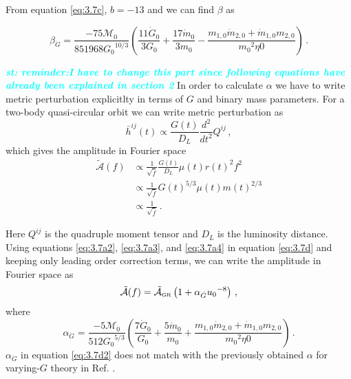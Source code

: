 \documentclass[prd,twocolumn,nofootinbib]{revtex4-1}
\newcommand{\GR}{{\mbox{\tiny GR}}}
\newcommand{\st}[1]{\textcolor{cyan}{\it{\textbf{st: #1}}} }
\begin{document}
\hspace*{15.5pt}From equation \eqref{eq:3.7c}, $b=-13$  and we can find $\beta$ as

 \begin{equation}
 \beta_{\dot{G}}=\frac{-75 \mathcal{M}_0}{851968 {G_0}^{10/3}} \left(\frac{11 \dot{G}_0}{3 G_0} + \frac{17 \dot{m}_0}{3m_0}-\frac{m_{1,0}\dot{m}_{2,0}+\dot{m}_{1,0}m_{2,0}}{{m_0}^2 \eta0}\right)\,.
  \end{equation}
 
 \hspace*{15.5pt}\st{reminder:I have to change this part since following equations have already been explained in section 2}In order to calculate $\alpha$ we have to write metric perturbation explicitlty in terms of $G$ and binary mass parameters. For a two-body quasi-circular orbit we can write metric perturbation as \cite{Blanchet:2002av}
 \begin{equation}
\bar{h}^{ij}(t)\propto \frac{G(t)}{D_L}\frac{d^2 }{d t^2}Q^{ij}\,,
 \end{equation}
which gives the amplitude in Fourier space
\begin{align}\label{eq:3.7d}
\tilde{\mathcal{A}}(f)&\propto\frac{1}{\sqrt{\dot{f}}}\frac{G(t)}{D_L}\mu(t) r(t)^2f^2\nonumber\\&\propto\frac{1}{\sqrt{\dot{f}}}{G(t)}^{5/3}\mu(t){m(t)}^{2/3}\nonumber\\ &\propto \frac{1}{\sqrt{\dot{f}}}  \,.
\end{align} 
 

Here $Q^{ij}$ is the quadruple moment tensor and $D_L$ is the luminosity distance. Using equations \eqref{eq:3.7a2}, \eqref{eq:3.7a3}, and \eqref{eq:3.7a4} in equation \eqref{eq:3.7d} and keeping only leading order correction terms, we can write the amplitude in Fourier space as
\begin{equation}
\tilde{\mathcal{A}}(f)=\tilde{\mathcal{A}}_{\GR}\left(1+\alpha_{\dot{G}}{u_0}^{-8}\right)\,,
\end{equation}
where
\begin{equation}\label{eq:3.7d2}
 \alpha_{\dot{G}}=\frac{-5\mathcal{M}_0}{512 {G_0}^{5/3}} \left(\frac{7 \dot{G}_0}{ G_0} + \frac{5\dot{m}_0}{m_0}+\frac{m_{1,0}\dot{m}_{2,0}+\dot{m}_{1,0}m_{2,0}}{{m_0}^2 \eta0}\right)\,.
 \end{equation}
 \hspace{15.5pt} $\alpha_{\dot{G}}$ in equation \eqref{eq:3.7d2} does not match with the previously obtained $\alpha$ for varying-$G$ theory in Ref. \cite{Yunes:2009bv}.
 
\end{document}
